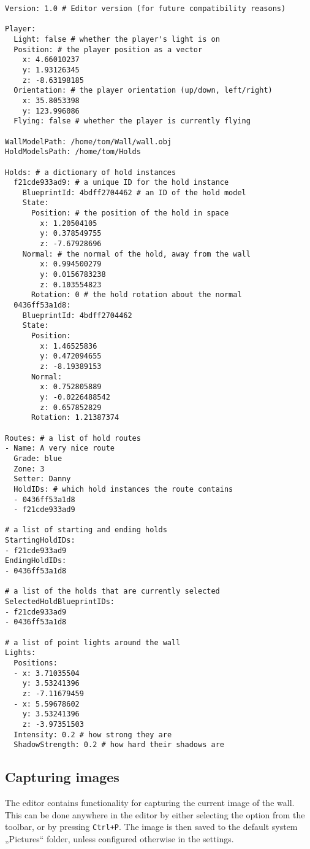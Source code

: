 \begin{verbatim}
Version: 1.0 # Editor version (for future compatibility reasons)

Player:
  Light: false # whether the player's light is on
  Position: # the player position as a vector
    x: 4.66010237
    y: 1.93126345
    z: -8.63198185
  Orientation: # the player orientation (up/down, left/right)
    x: 35.8053398
    y: 123.996086
  Flying: false # whether the player is currently flying

WallModelPath: /home/tom/Wall/wall.obj
HoldModelsPath: /home/tom/Holds

Holds: # a dictionary of hold instances
  f21cde933ad9: # a unique ID for the hold instance
    BlueprintId: 4bdff2704462 # an ID of the hold model
    State:
      Position: # the position of the hold in space
        x: 1.20504105
        y: 0.378549755
        z: -7.67928696
    Normal: # the normal of the hold, away from the wall
        x: 0.994500279
        y: 0.0156783238
        z: 0.103554823
      Rotation: 0 # the hold rotation about the normal
  0436ff53a1d8:
    BlueprintId: 4bdff2704462
    State:
      Position:
        x: 1.46525836
        y: 0.472094655
        z: -8.19389153
      Normal:
        x: 0.752805889
        y: -0.0226488542
        z: 0.657852829
      Rotation: 1.21387374

Routes: # a list of hold routes
- Name: A very nice route
  Grade: blue
  Zone: 3
  Setter: Danny
  HoldIDs: # which hold instances the route contains
  - 0436ff53a1d8
  - f21cde933ad9

# a list of starting and ending holds
StartingHoldIDs:
- f21cde933ad9
EndingHoldIDs:
- 0436ff53a1d8

# a list of the holds that are currently selected
SelectedHoldBlueprintIDs:
- f21cde933ad9
- 0436ff53a1d8

# a list of point lights around the wall
Lights:
  Positions:
  - x: 3.71035504
    y: 3.53241396
    z: -7.11679459
  - x: 5.59678602
    y: 3.53241396
    z: -3.97351503
  Intensity: 0.2 # how strong they are
  ShadowStrength: 0.2 # how hard their shadows are
\end{verbatim}

\subsection{Capturing images}
The editor contains functionality for capturing the current image of the wall.
This can be done anywhere in the editor by either selecting the option from the toolbar, or by pressing \verb|Ctrl+P|.
The image is then saved to the default system „Pictures“ folder, unless configured otherwise in the settings.

